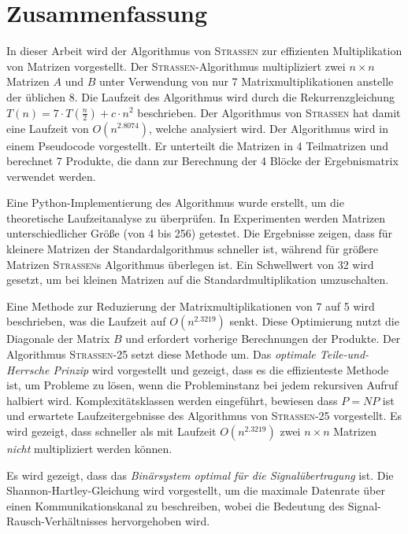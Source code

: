 \documentclass{scrartcl}
\numberwithin{equation}{section}
\begin{document}
\section{Zusammenfassung}
In dieser Arbeit wird der Algorithmus von \textsc{Strassen} zur effizienten Multiplikation von Matrizen vorgestellt. Der \textsc{Strassen}-Algorithmus multipliziert zwei $n \times n$ Matrizen $A$ und $B$ unter Verwendung von nur 7 Matrixmultiplikationen anstelle der üblichen 8. Die Laufzeit des Algorithmus wird durch die Rekurrenzgleichung $T(n) = 7 \cdot T\left(\frac{n}{2}\right) + c \cdot n^2$ beschrieben. Der Algorithmus von \textsc{Strassen} hat damit eine Laufzeit von $O(n^{2.8074})$, welche analysiert wird. Der Algorithmus wird in einem Pseudocode vorgestellt. Er unterteilt die Matrizen in 4 Teilmatrizen und berechnet 7 Produkte, die dann zur Berechnung der 4 Blöcke der Ergebnismatrix verwendet werden.

Eine Python-Implementierung des Algorithmus wurde erstellt, um die theoretische Laufzeitanalyse zu überprüfen. In Experimenten werden Matrizen unterschiedlicher Größe (von 4 bis 256) getestet. Die Ergebnisse zeigen, dass für kleinere Matrizen der Standardalgorithmus schneller ist, während für größere Matrizen \textsc{Strassen}s Algorithmus überlegen ist. Ein Schwellwert von 32 wird gesetzt, um bei kleinen Matrizen auf die Standardmultiplikation umzuschalten.

Eine Methode zur Reduzierung der Matrixmultiplikationen von 7 auf 5 wird beschrieben, was die Laufzeit auf $O(n^{2.3219})$ senkt. Diese Optimierung nutzt die Diagonale der Matrix $B$ und erfordert vorherige Berechnungen der Produkte. Der Algorithmus \textsc{Strassen-25} setzt diese Methode um. Das \textit{optimale Teile-und-Herrsche Prinzip} wird vorgestellt und gezeigt, dass es die effizienteste Methode ist, um Probleme zu lösen, wenn die Probleminstanz bei jedem rekursiven Aufruf halbiert wird. Komplexitätsklassen werden eingeführt, bewiesen dass $P = NP$ ist und erwartete Laufzeitergebnisse des Algorithmus von \textsc{Strassen-25} vorgestellt. Es wird gezeigt, dass schneller als mit Laufzeit $O(n^{2.3219})$ zwei $n \times n$ Matrizen \textit{nicht} multipliziert werden können.

Es wird gezeigt, dass das \textit{Binärsystem optimal für die Signalübertragung} ist. Die Shannon-Hartley-Gleichung wird vorgestellt, um die maximale Datenrate über einen Kommunikationskanal zu beschreiben, wobei die Bedeutung des Signal-Rausch-Verhältnisses hervorgehoben wird.
\end{document}
